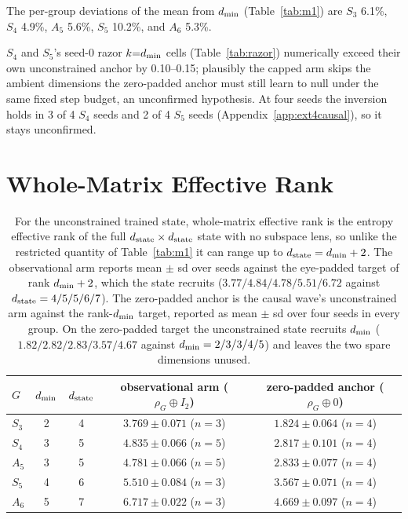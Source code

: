 The per-group deviations of the mean from $d_{\min}$ (Table~\ref{tab:m1}) are
$S_3$ 6.1\%, $S_4$ 4.9\%, $A_5$ 5.6\%, $S_5$ 10.2\%, and $A_6$ 5.3\%.

$S_4$ and $S_5$'s seed-0 razor $k{=}d_{\min}$ cells (Table~\ref{tab:razor}) numerically exceed their own unconstrained anchor by 0.10--0.15;
plausibly the capped arm skips the ambient dimensions the zero-padded
anchor must still learn to null under the same fixed step budget, an
unconfirmed hypothesis.
At four seeds the inversion holds in 3 of 4 $S_4$ seeds and 2 of 4
$S_5$ seeds (Appendix~\ref{app:ext4causal}), so it stays unconfirmed.

\section{Whole-Matrix Effective Rank}
\label{app:wmrank}

\begin{table}[H]
\centering
\small
\begin{tabular}{lcccc}
\toprule
$G$ & $d_{\min}$ & $d_{\mathrm{state}}$ & observational arm ($\rho_G \oplus I_2$) & zero-padded anchor ($\rho_G \oplus 0$) \\
\midrule
$S_3$ & 2 & 4 & $3.769 \pm 0.071$ ($n{=}3$) & $1.824 \pm 0.064$ ($n{=}4$) \\
$S_4$ & 3 & 5 & $4.835 \pm 0.066$ ($n{=}5$) & $2.817 \pm 0.101$ ($n{=}4$) \\
$A_5$ & 3 & 5 & $4.781 \pm 0.066$ ($n{=}5$) & $2.833 \pm 0.077$ ($n{=}4$) \\
$S_5$ & 4 & 6 & $5.510 \pm 0.084$ ($n{=}3$) & $3.567 \pm 0.071$ ($n{=}4$) \\
$A_6$ & 5 & 7 & $6.717 \pm 0.022$ ($n{=}3$) & $4.669 \pm 0.097$ ($n{=}4$) \\
\bottomrule
\end{tabular}
\caption{For the unconstrained trained state, whole-matrix effective rank is
the entropy effective rank of the full $d_{\mathrm{state}} \times d_{\mathrm{state}}$ state with no
subspace lens, so unlike the restricted quantity of Table~\ref{tab:m1} it can
range up to $d_{\mathrm{state}} = d_{\min} + 2$. The observational arm reports mean $\pm$ sd
over seeds against the eye-padded target of rank $d_{\min} + 2$, which the state
recruits ($3.77/4.84/4.78/5.51/6.72$ against $d_{\mathrm{state}} = 4/5/5/6/7$). The
zero-padded anchor is the causal wave's unconstrained arm against the
rank-$d_{\min}$ target, reported as mean $\pm$ sd over four seeds in every group.
On the
zero-padded target the unconstrained state recruits $d_{\min}$
($1.82/2.82/2.83/3.57/4.67$ against $d_{\min} = 2/3/3/4/5$) and leaves the
two spare dimensions unused.}
\label{tab:wmrank}
\end{table}

